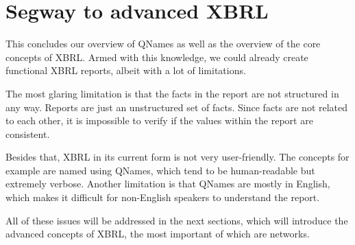 \section{Segway to advanced XBRL}

This concludes our overview of QNames as well as the overview of the core concepts of XBRL.
Armed with this knowledge, we could already create functional XBRL reports, albeit with a lot of limitations.

The most glaring limitation is that the facts in the report are not structured in any way.
Reports are just an unstructured set of facts.
Since facts are not related to each other, it is impossible to verify if the values within the report are consistent.

Besides that, XBRL in its current form is not very user-friendly.
The concepts for example are named using QNames, which tend to be human-readable but extremely verbose.
Another limitation is that QNames are mostly in English, which makes it difficult for non-English speakers to understand the report.

All of these issues will be addressed in the next sections, which will introduce the advanced concepts of XBRL, 
the most important of which are networks.
